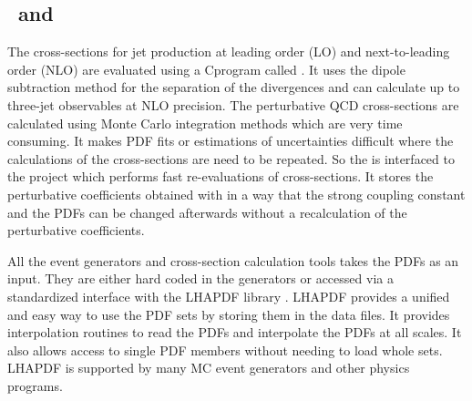 \subsection{\NLOJET~and \fastNLO}
\label{Sec:NLO}
The cross-sections for jet production at leading order (LO) and next-to-leading order (NLO) are evaluated using a C\plusn\plus program called \NLOJETPP \cite{Nagy:2001fj,Nagy:2003tz}. It uses the dipole subtraction method for the separation of the divergences and can calculate up to three-jet observables at NLO precision. The perturbative QCD cross-sections are calculated using Monte Carlo integration methods which are very time consuming. It makes PDF fits or estimations of uncertainties difficult where the calculations of the cross-sections are need to be repeated. So the \NLOJETPP is interfaced to the \fastNLO project \cite{Kluge:2006xs,Britzger:2012bs} which performs fast re-evaluations of cross-sections. It stores the perturbative coefficients obtained with \NLOJETPP in a way that the strong coupling constant and the PDFs can be changed afterwards without a recalculation of the perturbative coefficients.

All the event generators and cross-section calculation tools takes the PDFs as an input. They are either hard coded in the generators or accessed via a standardized interface with the LHAPDF library \cite{Whalley:2005nh,Buckley:2014ana}. LHAPDF provides a unified and easy way to use the PDF sets by storing them in the data files. It provides interpolation routines to read the PDFs and interpolate the PDFs at all scales. It also allows access to single PDF members without needing to load whole sets. LHAPDF is supported by many MC event generators and other physics programs.


